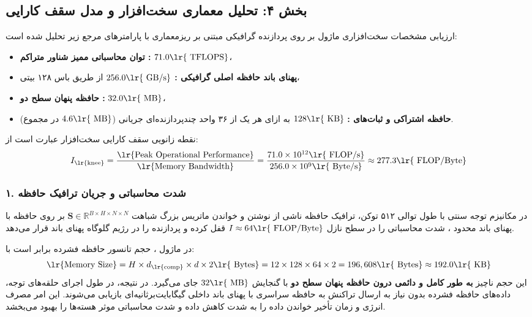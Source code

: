 \subsection*{بخش ۴: تحلیل معماری سخت‌افزار و مدل سقف کارایی }
ارزیابی مشخصات سخت‌افزاری ماژول  بر روی پردازنده گرافیکی  مبتنی بر ریزمعماری  با پارامترهای مرجع زیر تحلیل شده است:
\begin{itemize}
    \item \textbf{توان محاسباتی ممیز شناور متراکم :} $71.0 \text{\lr{ TFLOPS}}$،
    \item \textbf{پهنای باند حافظه اصلی گرافیکی :} $256.0 \text{\lr{ GB/s}}$ از طریق باس ۱۲۸ بیتی،
    \item \textbf{حافظه پنهان سطح دو :} $32.0 \text{\lr{ MB}}$،
    \item \textbf{حافظه اشتراکی و ثبات‌های  :} $128 \text{\lr{ KB}}$ به ازای هر یک از ۳۶ واحد چندپردازنده‌ای جریانی ($4.6 \text{\lr{ MB}}$ در مجموع).
\end{itemize}

نقطه زانویی سقف کارایی  سخت‌افزار عبارت است از:
\begin{equation}
I_{\text{\lr{knee}}} = \frac{\text{\lr{Peak Operational Performance}}}{\text{\lr{Memory Bandwidth}}} = \frac{71.0 \times 10^{12} \text{\lr{ FLOP/s}}}{256.0 \times 10^9 \text{\lr{ Byte/s}}} \approx 277.3 \text{\lr{ FLOP/Byte}}
\end{equation}

\subsubsection*{۱. شدت محاسباتی و جریان ترافیک حافظه}
در مکانیزم توجه سنتی  با طول توالی ۵۱۲ توکن، ترافیک حافظه ناشی از نوشتن و خواندن ماتریس بزرگ شباهت $\mathbf{S} \in \mathbb{R}^{B \times H \times N \times N}$ بر روی حافظه با پهنای باند محدود ، شدت محاسباتی را در سطح نازل $I \approx 64 \text{\lr{ FLOP/Byte}}$ قفل کرده و پردازنده را در رژیم گلوگاه پهنای باند قرار می‌دهد.

در ماژول ، حجم تانسور حافظه فشرده برابر است با:
\begin{equation}
\text{\lr{Memory Size}} = H \times d_{\text{\lr{comp}}} \times d \times 2 \text{\lr{ Bytes}} = 12 \times 128 \times 64 \times 2 = 196,608 \text{\lr{ Bytes}} \approx 192.0 \text{\lr{ KB}}
\end{equation}
این حجم ناچیز  \textbf{به طور کامل و دائمی درون حافظه پنهان سطح دو } با گنجایش $32 \text{\lr{ MB}}$ جای می‌گیرد. در نتیجه، در طول اجرای حلقه‌های توجه، داده‌های حافظه فشرده بدون نیاز به ارسال تراکنش به حافظه سراسری  با پهنای باند داخلی گیگابایت‌برثانیه‌ای  بازیابی می‌شوند. این امر مصرف انرژی و زمان تأخیر خواندن داده را به شدت کاهش داده و شدت محاسباتی موثر هسته‌ها را بهبود می‌بخشد.

